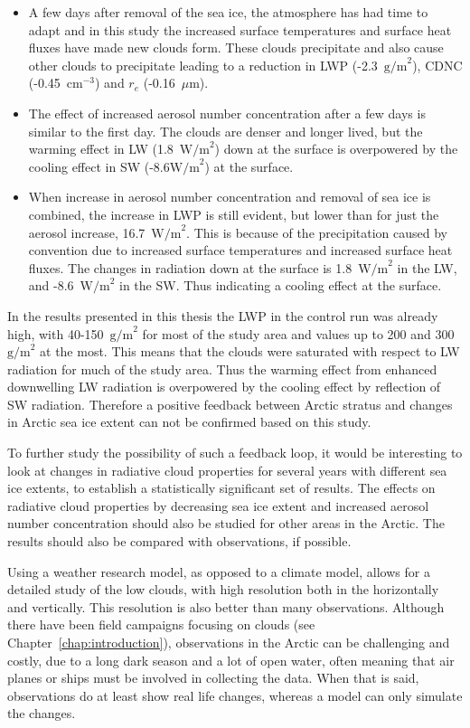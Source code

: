 \begin{itemize}
\item A few days after removal of the sea ice, the atmosphere has had time to adapt and in this study the increased surface temperatures and surface heat fluxes have made new clouds form. These clouds precipitate and also cause other clouds to precipitate leading to a reduction in LWP (-2.3~$\text{g/m}^2$), CDNC (-0.45~$\text{cm}^{-3}$) and $r_e$ (-0.16~$\mu\text{m}$).
\item The effect of increased aerosol number concentration after a few days is similar to the first day. The clouds are denser and longer lived, but the warming effect in LW (1.8~$\text{W/m}^2$) down at the surface is overpowered by the cooling effect in SW (-8.6$\text{W/m}^2$) at the surface.
\item When increase in aerosol number concentration and removal of sea ice is combined, the increase in LWP is still evident, but lower than for just the aerosol increase, 16.7~$\text{W/m}^2$. This is because of the precipitation caused by convention due to increased surface temperatures and increased surface heat fluxes. The changes in radiation down at the surface is 1.8~$\text{W/m}^2$ in the LW, and -8.6~$\text{W/m}^2$ in the SW. Thus indicating a cooling effect at the surface.
\end{itemize}

In the results presented in this thesis the LWP in the control run was already high, with 40-150~$\text{g/m}^2$ for most of the study area and values up to 200 and 300~$\text{g/m}^2$ at the most. This means that the clouds were saturated with respect to LW radiation for much of the study area. Thus the warming effect from enhanced downwelling LW radiation is overpowered by the cooling effect by reflection of SW radiation. Therefore a positive feedback between Arctic stratus and changes in Arctic sea ice extent can not be confirmed based on this study.

To further study the possibility of such a feedback loop, it would be interesting to look at changes in radiative cloud properties for several years with different sea ice extents, to establish a statistically significant set of results. The effects on radiative cloud properties by decreasing sea ice extent and increased aerosol number concentration should also be studied for other areas in the Arctic. The results should also be compared with observations, if possible.

Using a weather research model, as opposed to a climate model, allows for a detailed study of the low clouds, with high resolution both in the horizontally and vertically. This resolution is also better than many observations. Although there have been field campaigns focusing on clouds (see Chapter~\ref{chap:introduction}), observations in the Arctic can be challenging and costly, due to a long dark season and a lot of open water, often meaning that air planes or ships must be involved in collecting the data. When that is said, observations do at least show real life changes, whereas a model can only simulate the changes.



